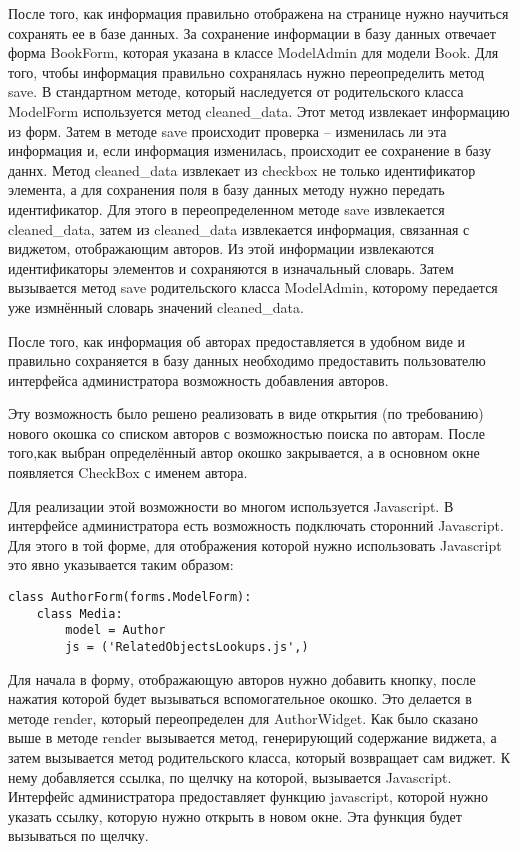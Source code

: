 \documentclass[a4paper, 12pt]{report}
\begin{document}
После того, как информация правильно отображена на странице нужно научиться сохранять ее в базе данных. За сохранение  информации в базу данных отвечает форма BookForm, которая указана в классе ModelAdmin для модели Book. Для того, чтобы информация правильно сохранялась нужно переопределить метод save. В стандартном методе, который наследуется от родительского класса ModelForm используется метод cleaned\_data. Этот метод извлекает информацию из форм. Затем в методе save происходит проверка -- изменилась ли эта информация и, если информация изменилась, происходит ее сохранение в базу даннх. Метод cleaned\_data извлекает из checkbox не только идентификатор элемента, а для сохранения поля в базу данных методу нужно передать идентификатор. Для этого в переопределенном методе save извлекается cleaned\_data, затем из cleaned\_data извлекается информация, связанная с виджетом, отображающим авторов. Из этой информации извлекаются идентификаторы элементов и сохраняются в изначальный словарь. Затем вызывается метод save родительского класса ModelAdmin, которому передается уже измнённый словарь значений cleaned\_data. 

После того, как информация об авторах предоставляется в удобном виде и правильно сохраняется в базу данных необходимо предоставить пользователю интерфейса администратора возможность добавления авторов. 

Эту возможность было решено реализовать в виде открытия (по требованию) нового окошка со списком авторов с возможностью поиска по авторам. После того,как выбран определённый автор окошко закрывается, а в основном окне появляется CheckBox с именем автора. 

Для реализации этой возможности во многом используется Javascript. В интерфейсе администратора есть возможность подключать сторонний Javascript. Для этого в той форме, для отображения которой нужно использовать Javascript это явно указывается таким образом:

\begin{verbatim}
class AuthorForm(forms.ModelForm):
    class Media:
    	model = Author
        js = ('RelatedObjectsLookups.js',)

\end{verbatim}

Для начала в форму, отображающую авторов нужно добавить кнопку, после нажатия которой будет вызываться вспомогательное окошко. Это делается в методе render, который переопределен для AuthorWidget. Как было сказано выше в методе render вызывается метод, генерирующий содержание виджета, а затем вызывается метод родительского класса, который возвращает сам виджет. К нему добавляется ссылка, по щелчку на которой, вызывается Javascript. Интерфейс администратора предоставляет функцию javascript, которой нужно указать ссылку, которую нужно открыть в новом окне. Эта функция будет вызываться по щелчку. 
\end{document}
